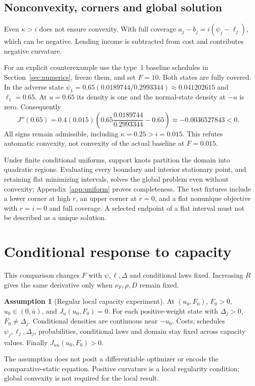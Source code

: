 \documentclass[11pt]{article}
\theoremstyle{definition}
\newtheorem{assumption}{Assumption}
\begin{document}
\subsection{Nonconvexity, corners and global solution}
Even $\kappa>i$ does not ensure convexity. With full coverage $a_j-b_j=i(\psi_j-\ell_j)$, which can be negative. Lending income is subtracted from cost and contributes negative curvature.

For an explicit counterexample use the type~1 baseline schedules in Section~\ref{sec:numerics}, freeze them, and set $F=10$. Both states are fully covered. In the adverse state $\psi_1=0.65(0.0189744/0.2993344)\approx0.041202615$ and $\ell_1=0.65$. At $u=0.65$ its density is one and the normal-state density at $-u$ is zero. Consequently
\[
 J''(0.65)=0.4(0.015)\left(0.65\frac{0.0189744}{0.2993344}-0.65\right)
 \approx-0.0036527843<0.
\]
All signs remain admissible, including $\kappa=0.25>i=0.015$. This refutes automatic convexity, not convexity of the actual baseline at $F=0.015$.

Under finite conditional uniforms, support knots partition the domain into quadratic regions. Evaluating every boundary and interior stationary point, and retaining flat minimizing intervals, solves the global problem even without convexity; Appendix~\ref{app:uniform} proves completeness. The test fixtures include a lower corner at high $r$, an upper corner at $r=0$, and a flat nonunique objective with $r=i=0$ and full coverage. A selected endpoint of a flat interval must not be described as a unique solution.

\section{Conditional response to capacity}
This comparison changes $F$ with $\psi,\ell,\Delta$ and conditional laws fixed. Increasing $R$ gives the same derivative only when $\nu_F,\rho,D$ remain fixed.

\begin{assumption}[Regular local capacity experiment]\label{ass:regular}
At $(u_0,F_0)$, $F_0>0$, $u_0\in(0,\bar u)$, and $J_u(u_0,F_0)=0$. For each positive-weight state with $\Delta_j>0$, $F_0\ne\Delta_j$. Conditional densities are continuous near $-u_0$. Costs, schedules $\psi_j,\ell_j,\Delta_j$, probabilities, conditional laws and domain stay fixed across capacity values. Finally $J_{uu}(u_0,F_0)>0$.
\end{assumption}
The assumption does not posit a differentiable optimizer or encode the comparative-static equation. Positive curvature is a local regularity condition; global convexity is not required for the local result.
\end{document}
